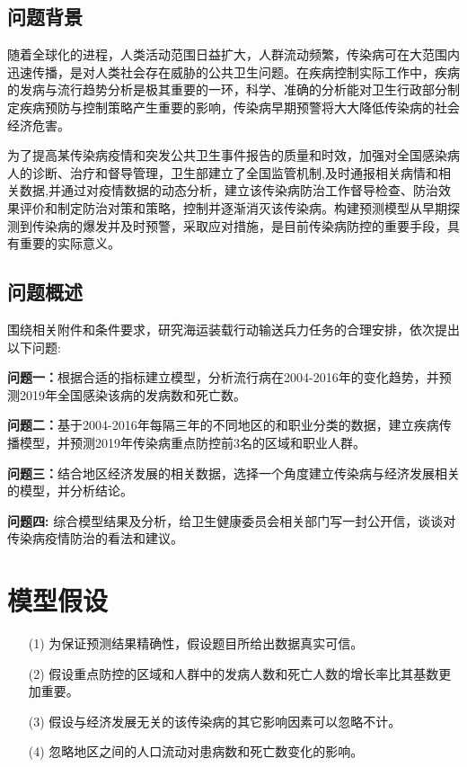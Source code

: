 \documentclass{whutmod}
\begin{document}
	\subsection{问题背景}
    随着全球化的进程，人类活动范围日益扩大，人群流动频繁，传染病可在大范围内迅速传播，是对人类社会存在威胁的公共卫生问题。在疾病控制实际工作中，疾病的发病与流行趋势分析是极其重要的一环，科学、准确的分析能对卫生行政部分制定疾病预防与控制策略产生重要的影响，传染病早期预警将大大降低传染病的社会经济危害。
    
    为了提高某传染病疫情和突发公共卫生事件报告的质量和时效，加强对全国感染病人的诊断、治疗和督导管理，卫生部建立了全国监管机制,及时通报相关病情和相关数据,并通过对疫情数据的动态分析，建立该传染病防治工作督导检查、防治效果评价和制定防治对策和策略，控制并逐渐消灭该传染病。构建预测模型从早期探测到传染病的爆发并及时预警，采取应对措施，是目前传染病防控的重要手段，具有重要的实际意义。
    
    

	\subsection{问题概述}
    围绕相关附件和条件要求，研究海运装载行动输送兵力任务的合理安排，依次提出以下问题:
		 
	
	\textbf{问题一：}根据合适的指标建立模型，分析流行病在2004-2016年的变化趋势，并预测2019年全国感染该病的发病数和死亡数。
	
	\textbf{问题二：}基于2004-2016年每隔三年的不同地区的和职业分类的数据，建立疾病传播模型，并预测2019年传染病重点防控前3名的区域和职业人群。
		
	\textbf{问题三：}结合地区经济发展的相关数据，选择一个角度建立传染病与经济发展相关的模型，并分析结论。
	
	\textbf{问题四: }综合模型结果及分析，给卫生健康委员会相关部门写一封公开信，谈谈对传染病疫情防治的看法和建议。
	
	
	\section{模型假设}
	\begin{itemize}                                             
		\item [(1)] 为保证预测结果精确性，假设题目所给出数据真实可信。
		\item [(2)] 假设重点防控的区域和人群中的发病人数和死亡人数的增长率比其基数更加重要。
		\item [(3)] 假设与经济发展无关的该传染病的其它影响因素可以忽略不计。
		\item [(4)]	忽略地区之间的人口流动对患病数和死亡数变化的影响。
	\end{itemize}
	
\end{document}
